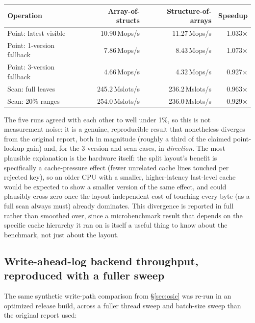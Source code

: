 \documentclass[11pt]{article}
\begin{document}
\begin{center}
\begin{tabular}{lrrr}
\toprule
Operation & Array-of-structs & Structure-of-arrays & Speedup \\
\midrule
Point: latest visible & 10.90\,Mops/s & 11.27\,Mops/s & 1.033$\times$ \\
Point: 1-version fallback & 7.86\,Mops/s & 8.43\,Mops/s & 1.073$\times$ \\
Point: 3-version fallback & 4.66\,Mops/s & 4.32\,Mops/s & 0.927$\times$ \\
Scan: full leaves & 245.2\,Mslots/s & 236.2\,Mslots/s & 0.963$\times$ \\
Scan: 20\% ranges & 254.0\,Mslots/s & 236.0\,Mslots/s & 0.929$\times$ \\
\bottomrule
\end{tabular}
\end{center}

The five runs agreed with each other to well under 1\%, so this is not measurement
noise: it is a genuine, reproducible result that nonetheless diverges from the
original report, both in magnitude (roughly a third of the claimed point-lookup
gain) and, for the 3-version and scan cases, in \emph{direction}. The most plausible
explanation is the hardware itself: the split layout's benefit is specifically a
cache-pressure effect (fewer unrelated cache lines touched per rejected key), so an
older CPU with a smaller, higher-latency last-level cache would be expected to show a
smaller version of the same effect, and could plausibly cross zero once the
layout-independent cost of touching every byte (as a full scan always must) already
dominates. This divergence is reported in full rather than smoothed over, since a
microbenchmark result that depends on the specific cache hierarchy it ran on is
itself a useful thing to know about the benchmark, not just about the layout.

\subsection{Write-ahead-log backend throughput, reproduced with a fuller sweep}

The same synthetic write-path comparison from \S\ref{sec:osic} was re-run in an
optimized release build, across a fuller thread sweep and batch-size sweep than the
original report used:
\end{document}
